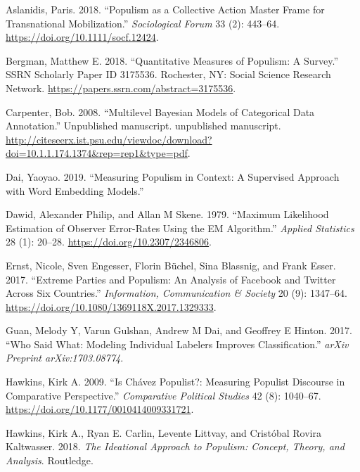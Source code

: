 \documentclass[]{article}
\begin{document}
\hypertarget{refs}{}
\leavevmode\hypertarget{ref-aslanidis_populism_2018}{}%
Aslanidis, Paris. 2018. ``Populism as a Collective Action Master Frame
for Transnational Mobilization.'' \emph{Sociological Forum} 33 (2):
443--64. \url{https://doi.org/10.1111/socf.12424}.

\leavevmode\hypertarget{ref-bergman_quantitative_2018}{}%
Bergman, Matthew E. 2018. ``Quantitative Measures of Populism: A
Survey.'' SSRN Scholarly Paper ID 3175536. Rochester, NY: Social Science
Research Network. \url{https://papers.ssrn.com/abstract=3175536}.

\leavevmode\hypertarget{ref-carpenter_multilevel_2008}{}%
Carpenter, Bob. 2008. ``Multilevel Bayesian Models of Categorical Data
Annotation.'' Unpublished manuscript. unpublished manuscript.
\url{http://citeseerx.ist.psu.edu/viewdoc/download?doi=10.1.1.174.1374\&rep=rep1\&type=pdf}.

\leavevmode\hypertarget{ref-dai_measuring_2019}{}%
Dai, Yaoyao. 2019. ``Measuring Populism in Context: A Supervised
Approach with Word Embedding Models.''

\leavevmode\hypertarget{ref-dawid_maximum_1979}{}%
Dawid, Alexander Philip, and Allan M Skene. 1979. ``Maximum Likelihood
Estimation of Observer Error-Rates Using the EM Algorithm.''
\emph{Applied Statistics} 28 (1): 20--28.
\url{https://doi.org/10.2307/2346806}.

\leavevmode\hypertarget{ref-ernst_extreme_2017}{}%
Ernst, Nicole, Sven Engesser, Florin Büchel, Sina Blassnig, and Frank
Esser. 2017. ``Extreme Parties and Populism: An Analysis of Facebook and
Twitter Across Six Countries.'' \emph{Information, Communication \&
Society} 20 (9): 1347--64.
\url{https://doi.org/10.1080/1369118X.2017.1329333}.

\leavevmode\hypertarget{ref-guan_who_2017}{}%
Guan, Melody Y, Varun Gulshan, Andrew M Dai, and Geoffrey E Hinton.
2017. ``Who Said What: Modeling Individual Labelers Improves
Classification.'' \emph{arXiv Preprint arXiv:1703.08774}.

\leavevmode\hypertarget{ref-hawkins_is_2009}{}%
Hawkins, Kirk A. 2009. ``Is Chávez Populist?: Measuring Populist
Discourse in Comparative Perspective.'' \emph{Comparative Political
Studies} 42 (8): 1040--67.
\url{https://doi.org/10.1177/0010414009331721}.

\leavevmode\hypertarget{ref-hawkins_ideational_2018-1}{}%
Hawkins, Kirk A., Ryan E. Carlin, Levente Littvay, and Cristóbal Rovira
Kaltwasser. 2018. \emph{The Ideational Approach to Populism: Concept,
Theory, and Analysis}. Routledge.
\end{document}
